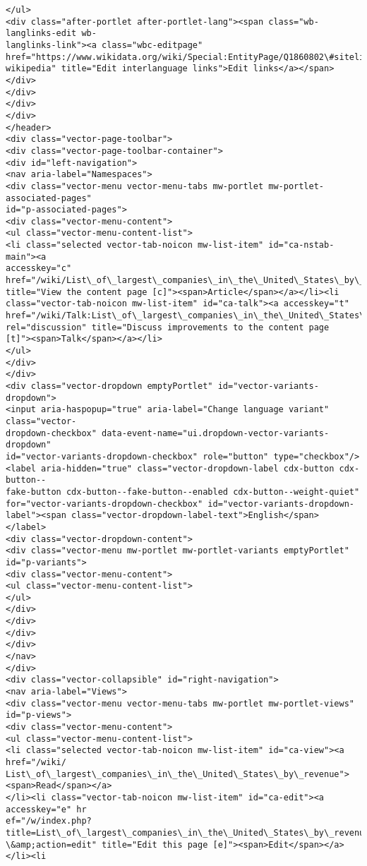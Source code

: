 \documentclass[11pt]{article}
\begin{document}
\begin{Verbatim}[commandchars=\\\{\}]
</ul>
<div class="after-portlet after-portlet-lang"><span class="wb-langlinks-edit wb-
langlinks-link"><a class="wbc-editpage"
href="https://www.wikidata.org/wiki/Special:EntityPage/Q1860802\#sitelinks-
wikipedia" title="Edit interlanguage links">Edit links</a></span></div>
</div>
</div>
</div>
</header>
<div class="vector-page-toolbar">
<div class="vector-page-toolbar-container">
<div id="left-navigation">
<nav aria-label="Namespaces">
<div class="vector-menu vector-menu-tabs mw-portlet mw-portlet-associated-pages"
id="p-associated-pages">
<div class="vector-menu-content">
<ul class="vector-menu-content-list">
<li class="selected vector-tab-noicon mw-list-item" id="ca-nstab-main"><a
accesskey="c"
href="/wiki/List\_of\_largest\_companies\_in\_the\_United\_States\_by\_revenue"
title="View the content page [c]"><span>Article</span></a></li><li
class="vector-tab-noicon mw-list-item" id="ca-talk"><a accesskey="t"
href="/wiki/Talk:List\_of\_largest\_companies\_in\_the\_United\_States\_by\_revenue"
rel="discussion" title="Discuss improvements to the content page
[t]"><span>Talk</span></a></li>
</ul>
</div>
</div>
<div class="vector-dropdown emptyPortlet" id="vector-variants-dropdown">
<input aria-haspopup="true" aria-label="Change language variant" class="vector-
dropdown-checkbox" data-event-name="ui.dropdown-vector-variants-dropdown"
id="vector-variants-dropdown-checkbox" role="button" type="checkbox"/>
<label aria-hidden="true" class="vector-dropdown-label cdx-button cdx-button--
fake-button cdx-button--fake-button--enabled cdx-button--weight-quiet"
for="vector-variants-dropdown-checkbox" id="vector-variants-dropdown-
label"><span class="vector-dropdown-label-text">English</span>
</label>
<div class="vector-dropdown-content">
<div class="vector-menu mw-portlet mw-portlet-variants emptyPortlet"
id="p-variants">
<div class="vector-menu-content">
<ul class="vector-menu-content-list">
</ul>
</div>
</div>
</div>
</div>
</nav>
</div>
<div class="vector-collapsible" id="right-navigation">
<nav aria-label="Views">
<div class="vector-menu vector-menu-tabs mw-portlet mw-portlet-views"
id="p-views">
<div class="vector-menu-content">
<ul class="vector-menu-content-list">
<li class="selected vector-tab-noicon mw-list-item" id="ca-view"><a href="/wiki/
List\_of\_largest\_companies\_in\_the\_United\_States\_by\_revenue"><span>Read</span></a>
</li><li class="vector-tab-noicon mw-list-item" id="ca-edit"><a accesskey="e" hr
ef="/w/index.php?title=List\_of\_largest\_companies\_in\_the\_United\_States\_by\_revenue
\&amp;action=edit" title="Edit this page [e]"><span>Edit</span></a></li><li

\end{Verbatim}
\end{document}
